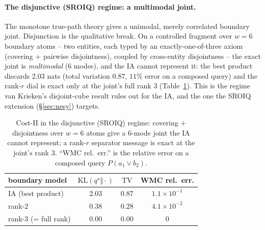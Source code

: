 \documentclass[anon]{nesy2026}
\begin{document}
\paragraph{The disjunctive (SROIQ) regime: a multimodal joint.}
The monotone true-path theory gives a unimodal, merely correlated boundary joint. Disjunction is the
qualitative break. On a controlled fragment over $w{=}6$ boundary atoms -- two entities, each typed by
an exactly-one-of-three axiom (covering $+$ pairwise disjointness), coupled by cross-entity
disjointness -- the exact joint is \emph{multimodal} ($6$ modes), and the IA cannot represent it:
the best product discards $2.03$ nats (total variation $0.87$, $11\%$ error on a composed query) and
the rank-$r$ dial is exact only at the joint's full rank $3$ (Table~\ref{tab:disj}). This is the
regime van Krieken's disjoint-cube result rules out for the IA, and the one the SROIQ extension
(\S\ref{sec:nesy}) targets.

\begin{table}[t]\centering
\caption{Cost-II in the disjunctive (SROIQ) regime: covering $+$ disjointness over $w{=}6$ atoms give a $6$-mode joint the IA cannot represent; a rank-$r$ separator message is exact at the joint's rank $3$. ``WMC rel.\ err.'' is the relative error on a composed query $P(a_1\vee b_2)$.}\label{tab:disj}
\small
\begin{tabular}{lccc}
\toprule
boundary model & $\mathrm{KL}(q^\star\Vert\cdot)$ & $\mathrm{TV}$ & WMC rel.\ err.\\
\midrule
IA (best product) & $2.03$ & $0.87$ & $1.1\times10^{-1}$\\
rank-$2$ & $0.38$ & $0.28$ & $4.1\times10^{-2}$\\
rank-$3$ (= full rank) & $0.00$ & $0.00$ & $0$\\
\bottomrule
\end{tabular}
\end{table}
\end{document}

